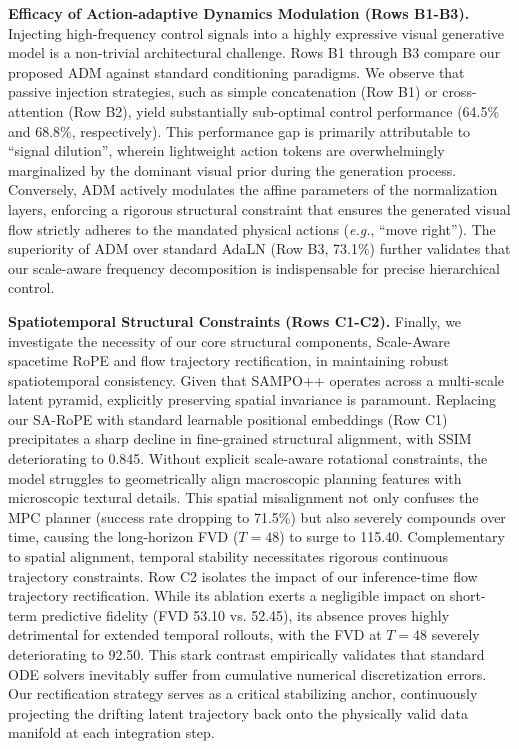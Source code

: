 \textbf{Efficacy of Action-adaptive Dynamics Modulation (Rows B1-B3).} Injecting high-frequency control signals into a highly expressive visual generative model is a non-trivial architectural challenge. Rows B1 through B3 compare our proposed ADM against standard conditioning paradigms. We observe that passive injection strategies, such as simple concatenation (Row B1) or cross-attention (Row B2), yield substantially sub-optimal control performance (64.5\% and 68.8\%, respectively). This performance gap is primarily attributable to ``signal dilution'', wherein lightweight action tokens are overwhelmingly marginalized by the dominant visual prior during the generation process. Conversely, ADM actively modulates the affine parameters of the normalization layers, enforcing a rigorous structural constraint that ensures the generated visual flow strictly adheres to the mandated physical actions (\textit{e.g.}, ``move right''). The superiority of ADM over standard AdaLN (Row B3, 73.1\%) further validates that our scale-aware frequency decomposition is indispensable for precise hierarchical control.

\textbf{Spatiotemporal Structural Constraints (Rows C1-C2).} Finally, we investigate the necessity of our core structural components, Scale-Aware spacetime RoPE and flow trajectory rectification, in maintaining robust spatiotemporal consistency. Given that SAMPO++ operates across a multi-scale latent pyramid, explicitly preserving spatial invariance is paramount. Replacing our SA-RoPE with standard learnable positional embeddings (Row C1) precipitates a sharp decline in fine-grained structural alignment, with SSIM deteriorating to 0.845. Without explicit scale-aware rotational constraints, the model struggles to geometrically align macroscopic planning features with microscopic textural details. This spatial misalignment not only confuses the MPC planner (success rate dropping to 71.5\%) but also severely compounds over time, causing the long-horizon FVD ($T=48$) to surge to 115.40. Complementary to spatial alignment, temporal stability necessitates rigorous continuous trajectory constraints. Row C2 isolates the impact of our inference-time flow trajectory rectification. While its ablation exerts a negligible impact on short-term predictive fidelity (FVD 53.10 vs. 52.45), its absence proves highly detrimental for extended temporal rollouts, with the FVD at $T=48$ severely deteriorating to 92.50.  This stark contrast empirically validates that standard ODE solvers inevitably suffer from cumulative numerical discretization errors. Our rectification strategy serves as a critical stabilizing anchor, continuously projecting the drifting latent trajectory back onto the physically valid data manifold at each integration step.


